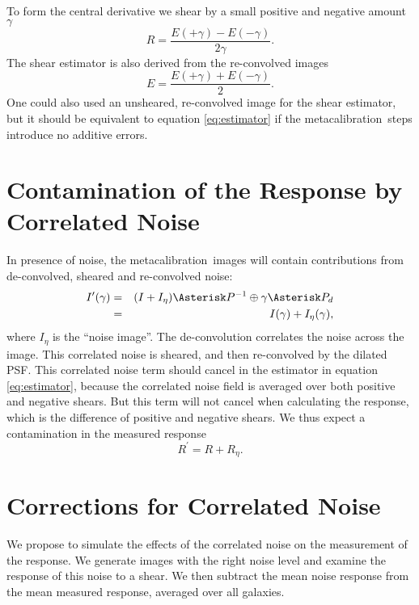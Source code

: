 \documentclass[usegraphicx,usenatbib]{mn2e}
\newcommand{\mcal}{metacalibration}
\begin{document}
To form the central derivative we shear by a small positive and negative
amount $\gamma$
\begin{equation} \label{eq:Rnum}
    R = \frac{E(+\gamma) - E(-\gamma)}{2 \gamma}.
\end{equation}
The shear estimator is also derived from the re-convolved
images
\begin{equation} \label{eq:estimator}
    E = \frac{E(+\gamma) + E(-\gamma)}{2}.
\end{equation}
One could also used an unsheared, re-convolved image for the
shear estimator, but it should be
equivalent to equation \ref{eq:estimator} if the \mcal\ steps
introduce no additive errors.

\section{Contamination of the Response by Correlated Noise} \label{sec:contam}

In presence of noise, the \mcal\ images will contain
contributions from de-convolved, sheared and re-convolved noise:
\begin{eqnarray}
    I^{\prime}(\gamma) & = & (I + I_\eta) \Asterisk P^{-1} \oplus \gamma \Asterisk P_{d} \nonumber \\
    & = & I(\gamma) + I_\eta(\gamma),
\end{eqnarray}
where $I_\eta$ is the ``noise image''.  The de-convolution correlates the noise
across the image.  This correlated noise is sheared, and then re-convolved by
the dilated PSF.  This correlated noise term should cancel in the estimator in
equation \ref{eq:estimator}, because the correlated noise field is averaged
over both positive and negative shears.  But this term will not cancel when
calculating the response, which is the difference of positive and negative
shears.  We thus expect a contamination in the measured response
\begin{equation}
    R^{\prime}  =  R + R_{\eta}.
\end{equation}

\section{Corrections for Correlated Noise} \label{sec:corr}

We propose to simulate the effects of the correlated noise on the measurement
of the response.  We generate images with the right noise level and examine
the response of this noise to a shear.  We then subtract the mean noise
response from the mean measured response, averaged over all galaxies.
\end{document}
